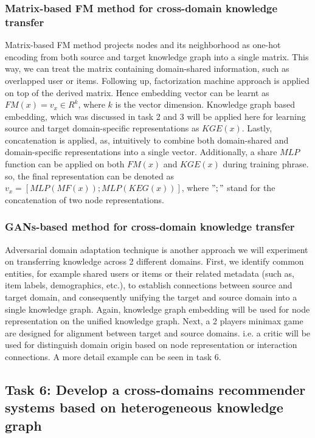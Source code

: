 \subsubsection*{Matrix-based FM method for cross-domain knowledge transfer}
Matrix-based FM method projects nodes and its neighborhood as one-hot encoding from both source and target knowledge graph into a single matrix. This way, we can treat the matrix containing domain-shared information, such as overlapped user or items. Following up, factorization machine approach is applied on top of the derived matrix. Hence embedding vector can be learnt as $FM(x) = v_x \in R^k$, where $k$ is the vector dimension. Knowledge graph based embedding, which was discussed in task 2 and 3 will be applied here for learning source and target domain-specific representations as $KGE(x)$.
Lastly, concatenation is applied, as, intuitively to combine both domain-shared and domain-specific representations into a single vector.
Additionally, a share $MLP$ function can be applied on both $FM(x)$ and $KGE(x)$ during training phrase. so, the final representation can be denoted as $v_x = [MLP(MF(x));MLP(KEG(x))]$, where $";"$ stand for the concatenation of two node representations.

\subsubsection*{GANs-based method for cross-domain knowledge transfer}
Adversarial domain adaptation technique is another approach we will experiment on transferring knowledge across 2 different domains.
First, we identify common entities, for example shared users or items or their related metadata (such as, item labels, demographics, etc.), to establish connections between source and target domain, and consequently unifying the target and source domain into a single knowledge graph.
Again, knowledge graph embedding will be used for node representation on the unified knowledge graph. Next, a 2 players minimax game are designed for alignment between target and source domains. i.e. a critic will be used for distinguish domain origin based on node representation or interaction connections. A more detail example can be seen in task 6.


\subsection*{Task 6: Develop a cross-domains recommender systems based on heterogeneous knowledge graph}

